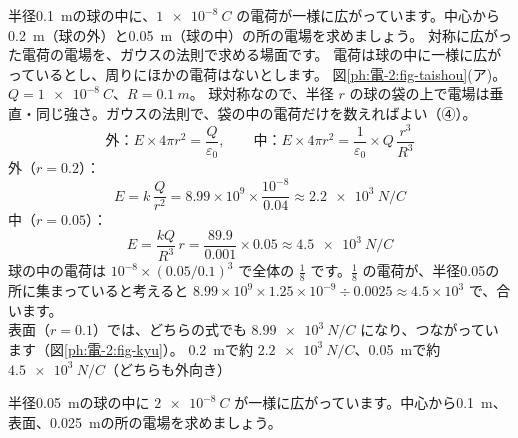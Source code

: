 \label{ph:電-2:ex1}
\begin{phreidai}[一様に帯電した球の電場]
半径\qty{0.1}{m}の球の中に、$\qty{1e-8}{C}$ の電荷が一様に広がっています。中心から\qty{0.2}{m}（球の外）と\qty{0.05}{m}（球の中）の所の電場を求めましょう。
\phbamen
対称に広がった電荷の電場を、ガウスの法則で求める場面です。
\phmushi
電荷は球の中に一様に広がっているとし、周りにほかの電荷はないとします。
\phzu
図\ref{ph:電-2:fig-taishou}(ア)。$Q=\qty{1e-8}{C}$、$R=\qty{0.1}{m}$。
\phriyu
球対称なので、半径 $r$ の球の袋の上で電場は垂直・同じ強さ。ガウスの法則で、袋の中の電荷だけを数えればよい（④）。
\phtateru
\[\text{外：}E\times4\pi r^2=\frac{Q}{\varepsilon_0},\qquad\text{中：}E\times4\pi r^2=\frac{1}{\varepsilon_0}\times Q\,\frac{r^3}{R^3}\]
\phtoku
外（$r=0.2$）：\[E=k\,\frac{Q}{r^2}=8.99\times10^9\times\frac{10^{-8}}{0.04}\approx\qty{2.2e3}{N/C}\]
中（$r=0.05$）：\[E=\frac{kQ}{R^3}\,r=\frac{89.9}{0.001}\times0.05\approx\qty{4.5e3}{N/C}\]
\phtashikame
球の中の電荷は $10^{-8}\times(0.05/0.1)^3$ で全体の $\tfrac18$ です。$\tfrac18$ の電荷が、半径0.05の所に集まっていると考えると $8.99\times10^9\times1.25\times10^{-9}\div0.0025\approx4.5\times10^3$ で、合います。\\
表面（$r=0.1$）では、どちらの式でも $\qty{8.99e3}{N/C}$ になり、つながっています（図\ref{ph:電-2:fig-kyu}）。
\kotae \qty{0.2}{m}で約 $\qty{2.2e3}{N/C}$、\qty{0.05}{m}で約 $\qty{4.5e3}{N/C}$（どちらも外向き）
\end{phreidai}
\begin{jibun}
半径\qty{0.05}{m}の球の中に $\qty{2e-8}{C}$ が一様に広がっています。中心から\qty{0.1}{m}、表面、\qty{0.025}{m}の所の電場を求めましょう。
\end{jibun}

